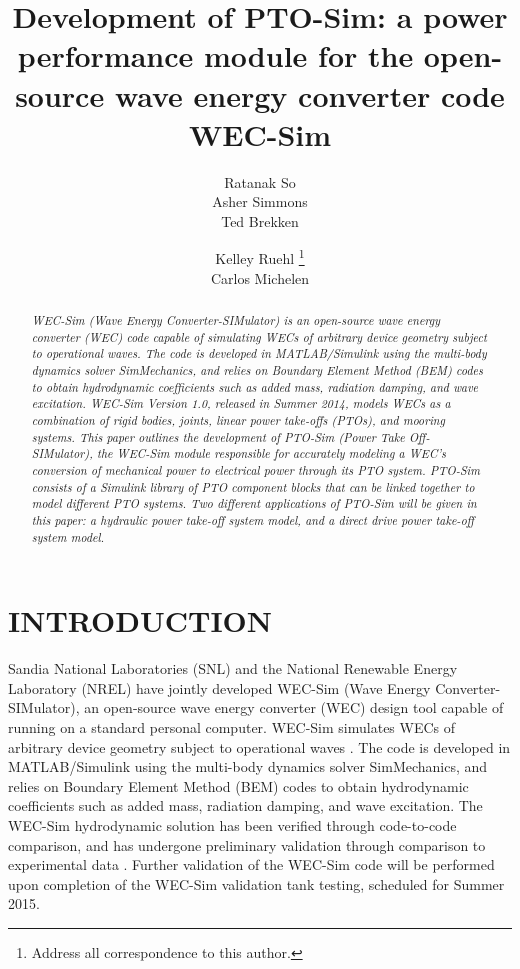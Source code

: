 \documentclass[twocolumn,10pt]{asme2e}
\title{Development of PTO-Sim: a power performance module for the open-source wave energy converter code WEC-Sim}
\author{Ratanak So\\
       {\tensfb Asher Simmons}   \\
       {\tensfb Ted Brekken}   
    \affiliation{
	School of Electrical Engineering and Computer Science\\
	Oregon State University\\
	Corvallis, Oregon USA\\
    }	
}
\author{Kelley Ruehl \thanks{Address all correspondence to this author.} \\
       {\tensfb Carlos Michelen}     
    \affiliation{Water Power Department \\
    	Sandia National Laboratories\\
	Albuquerque, NM USA\\
	Email: kelley.ruehl@sandia.gov
    }
}
\begin{document}
\maketitle    


\begin{abstract}
{\it 
WEC-Sim (Wave Energy Converter-SIMulator) is an open-source wave energy converter (WEC) code capable of simulating WECs of arbitrary device geometry subject to operational waves. The code is developed in MATLAB/Simulink using the multi-body dynamics solver SimMechanics, and relies on Boundary Element Method (BEM) codes to obtain hydrodynamic coefficients such as added mass, radiation damping, and wave excitation. WEC-Sim Version 1.0, released in Summer 2014, models WECs as a combination of rigid bodies, joints, linear power take-offs (PTOs), and mooring systems. This paper outlines the development of PTO-Sim (Power Take Off-SIMulator), the WEC-Sim module responsible for accurately modeling a WEC's conversion of mechanical power to electrical power through its PTO system. PTO-Sim consists of a Simulink library of PTO component blocks that can be linked together to model different PTO systems. Two different applications of PTO-Sim will be given in this paper: a hydraulic power take-off system model, and a direct drive power take-off system model.
}
\end{abstract}


\section*{INTRODUCTION}

Sandia National Laboratories (SNL) and the National Renewable Energy Laboratory (NREL) have jointly developed WEC-Sim (Wave Energy Converter-SIMulator), an open-source wave energy converter (WEC) design tool capable of running on a standard personal computer. WEC-Sim  simulates WECs of arbitrary device geometry subject to operational waves \cite{wecsim}. The code is developed in MATLAB/Simulink using the multi-body dynamics solver SimMechanics, and relies on Boundary Element Method (BEM) codes to obtain hydrodynamic coefficients such as added mass, radiation damping, and wave excitation. The WEC-Sim hydrodynamic solution has been verified through code-to-code comparison, and has undergone preliminary validation through comparison to experimental data \cite{yu2014design}\cite{lawson2014implementing} \cite{ruehl2014preliminary}\cite{yu2014development}.  
Further validation of the WEC-Sim code will be performed upon completion of the WEC-Sim validation tank testing, scheduled for Summer 2015. 
\end{document}
